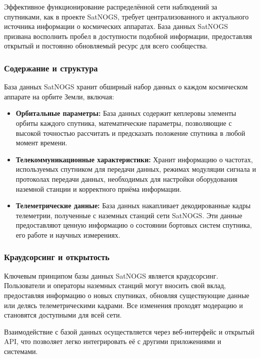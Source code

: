 \documentclass[14pt, a4paper]{extreport}
\begin{document}
    Эффективное функционирование распределённой сети наблюдений за спутниками, как в проекте SatNOGS, требует централизованного и актуального источника информации о космических аппаратах.
    База данных SatNOGS призвана восполнить пробел в доступности подобной информации, предоставляя открытый и постоянно обновляемый ресурс для всего сообщества.

    \subsubsection{Содержание и структура}

    База данных SatNOGS хранит обширный набор данных о каждом космическом аппарате на орбите Земли, включая:

    \begin{itemize}
        \item \textbf{Орбитальные параметры:} База данных содержит кеплеровы элементы орбиты каждого спутника,  математические параметры, позволяющие с высокой точностью рассчитать и предсказать положение спутника в любой момент времени.
        \item \textbf{Телекоммуникационные характеристики:} Хранит информацию о частотах, используемых спутником для передачи данных,  режимах модуляции сигнала и протоколах передачи данных, необходимых для настройки оборудования наземной станции и корректного приёма информации.
        \item \textbf{Телеметрические данные:}  База данных накапливает декодированные кадры телеметрии, полученные с наземных станций сети SatNOGS. Эти данные предоставляют ценную информацию о состоянии бортовых систем спутника, его работе и научных измерениях.
    \end{itemize}

    \subsubsection{Краудсорсинг и открытость}

    Ключевым принципом базы данных SatNOGS является краудсорсинг.
    Пользователи и операторы наземных станций могут вносить свой вклад, предоставляя информацию о новых спутниках, обновляя существующие данные или делясь телеметрическими кадрами.
    Все изменения проходят модерацию и становятся доступными для всей сети.

    Взаимодействие с базой данных осуществляется через веб-интерфейс и открытый API, что позволяет легко интегрировать её с другими приложениями и системами.
\end{document}
